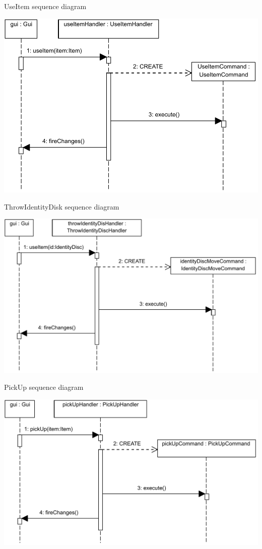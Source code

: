 \documentclass[11pt,t]{beamer}
\begin{document}
\begin{frame}{UseItem sequence diagram}
\begin{center}
\includegraphics[scale=0.45]{images/useitemhandlerseq}
\end{center}
\end{frame}

\begin{frame}{ThrowIdentityDisk sequence diagram}
\begin{center}
\includegraphics[scale=0.45]{images/throwIdentityDischandlerseq}
\end{center}
\end{frame}

\begin{frame}{PickUp sequence diagram}
\begin{center}
\includegraphics[scale=0.45]{images/PickUpItemhandlerseq}
\end{center}
\end{frame}
\end{document}
